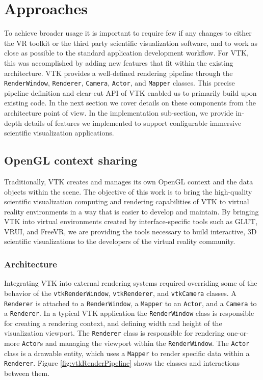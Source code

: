 \section{Approaches}

To achieve broader usage it is important to require few if any changes to either the VR toolkit or the third party scientific visualization software, and to work as close as possible to the standard application development workflow.
For VTK, this was accomplished by adding new features that fit within the existing architecture. 
VTK provides a well-defined rendering pipeline through the \texttt{RenderWindow}, \texttt{Renderer}, \texttt{Camera}, \texttt{Actor}, and \texttt{Mapper} classes.
This precise pipeline definition and clear-cut API of VTK enabled us to primarily build upon
existing code.
In the next section we cover details on these components from the architecture point of view.
In the implementation sub-section, we provide in-depth details of features we implemented to support configurable immersive scientific visualization applications. 

\subsection{OpenGL context sharing}

Traditionally, VTK creates and manages its own OpenGL context and the data objects within the scene.
The objective of this work is to bring the high-quality scientific visualization computing and rendering capabilities of VTK to virtual reality environments in a way that is easier to develop and maintain.
By bringing VTK into virtual environments created by interface-specific tools such as GLUT, VRUI, and FreeVR, we are providing the tools necessary to build interactive, 3D scientific visualizations to the developers of the virtual reality community.

\subsubsection{Architecture}

Integrating VTK into external rendering systems required overriding some of the behavior of the \texttt{vtkRenderWindow}, \texttt{vtkRenderer}, and \texttt{vtkCamera} classes.
A \texttt{Renderer} is attached to a \texttt{RenderWindow}, a \texttt{Mapper} to an \texttt{Actor}, and a \texttt{Camera} to a \texttt{Renderer}.
In a typical VTK application the \texttt{RenderWindow} class is responsible for creating a rendering context, and defining width and height of the visualization viewport.
The \texttt{Renderer} class is responsible for rendering one-or-more
\texttt{Actor}s and managing the viewport within the \texttt{RenderWindow}.
The \texttt{Actor} class is a drawable entity, which uses a \texttt{Mapper} to render specific data within a \texttt{Renderer}.
Figure \ref{fig:vtkRenderPipeline} shows the classes and interactions between them.

